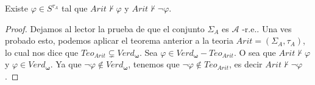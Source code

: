   \begin{corollary} \label{corollary_121}
    \PN Existe $\varphi \in S^{\tau_{A}}$ tal que $Arit \nvdash \varphi$ y $Arit \nvdash \lnot \varphi$.
  \end{corollary}
  \begin{proof}
    Dejamos al lector la prueba de que el conjunto $\Sigma _{A}$ es $\mathcal{A}$ -r.e.. Una ves probado esto, podemos
    aplicar el teorema anterior a la teoria $Arit=(\Sigma _{A},\tau _{A})$, lo cual nos dice que $Teo_{Arit}\subsetneq
    Verd_{\mathbf{\omega }}$. Sea $\varphi \in Verd_{\mathbf{\omega } }-Teo_{Arit} $. O sea que $Arit\nvdash \varphi $ y
    $\varphi \in Verd_{ \mathbf{\omega }}$. Ya que $\lnot \varphi \notin Verd_{\mathbf{\omega }}$, tenemos que $\lnot
    \varphi \notin Teo_{Arit}$, es decir $Arit\nvdash \lnot \varphi$.
  \end{proof}

